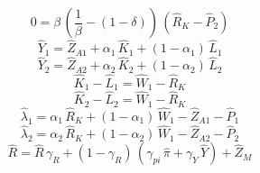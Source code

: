 \begin{dmath}
0={{\beta}}\, \left(\frac{1}{{{\beta}}}-\left(1-{{\delta}}\right)\right)\, \left({{\hat{R}_{K}}}-{{\hat{P}_{2}}}\right)
\end{dmath}
\begin{dmath}
{{\hat{Y}_{1}}}={{\hat{Z}_{A1}}}+{{\alpha_{1}}}\, {{\hat{K}_{1}}}+\left(1-{{\alpha_{1}}}\right)\, {{\hat{L}_{1}}}
\end{dmath}
\begin{dmath}
{{\hat{Y}_{2}}}={{\hat{Z}_{A2}}}+{{\alpha_{2}}}\, {{\hat{K}_{2}}}+\left(1-{{\alpha_{2}}}\right)\, {{\hat{L}_{2}}}
\end{dmath}
\begin{dmath}
{{\hat{K}_{1}}}-{{\hat{L}_{1}}}={{\hat{W}_{1}}}-{{\hat{R}_{K}}}
\end{dmath}
\begin{dmath}
{{\hat{K}_{2}}}-{{\hat{L}_{2}}}={{\hat{W}_{1}}}-{{\hat{R}_{K}}}
\end{dmath}
\begin{dmath}
{{\hat{\lambda}_{1}}}={{\alpha_{1}}}\, {{\hat{R}_{K}}}+\left(1-{{\alpha_{1}}}\right)\, {{\hat{W}_{1}}}-{{\hat{Z}_{A1}}}-{{\hat{P}_{1}}}
\end{dmath}
\begin{dmath}
{{\hat{\lambda}_{2}}}={{\alpha_{2}}}\, {{\hat{R}_{K}}}+\left(1-{{\alpha_{2}}}\right)\, {{\hat{W}_{1}}}-{{\hat{Z}_{A2}}}-{{\hat{P}_{2}}}
\end{dmath}
\begin{dmath}
{{\hat{R}}}={{\hat{R}}}\, {{\gamma_{R}}}+\left(1-{{\gamma_{R}}}\right)\, \left({{\gamma_{pi}}}\, {{\hat{\pi}}}+{{\gamma_{Y}}}\, {{\hat{Y}}}\right)+{{\hat{Z}_M}}
\end{dmath}
